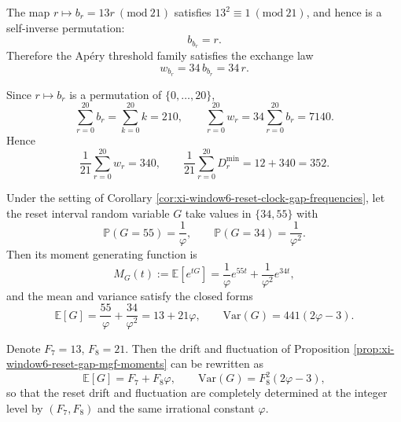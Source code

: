 

\begin{proposition}\label{prop:xi-window6-congruence-involution}
The map \(r\mapsto b_r=13r\ (\mathrm{mod}\ 21)\) satisfies \(13^2\equiv 1\ (\mathrm{mod}\ 21)\), and hence is a self-inverse permutation:
\[
b_{b_r}=r.
\]
Therefore the Ap\'ery threshold family satisfies the exchange law
\[
w_{b_r}=34\,b_{b_r}=34\,r.
\]
\end{proposition}

\begin{proposition}\label{prop:xi-window6-apery-first-moment}
Since \(r\mapsto b_r\) is a permutation of \(\{0,\dots,20\}\),
\[
\sum_{r=0}^{20}b_r=\sum_{k=0}^{20}k=210,
\qquad
\sum_{r=0}^{20}w_r=34\sum_{r=0}^{20}b_r=7140.
\]
Hence
\[
\frac{1}{21}\sum_{r=0}^{20}w_r=340,
\qquad
\frac{1}{21}\sum_{r=0}^{20}D_r^{\min}=12+340=352.
\]
\end{proposition}

\begin{proposition}\label{prop:xi-window6-reset-gap-mgf-moments}
Under the setting of Corollary \ref{cor:xi-window6-reset-clock-gap-frequencies},
let the reset interval random variable \(G\) take values in \(\{34,55\}\) with
\[
\mathbb P(G=55)=\frac{1}{\varphi},\qquad \mathbb P(G=34)=\frac{1}{\varphi^2}.
\]
Then its moment generating function is
\[
M_G(t):=\mathbb E[e^{tG}]
=\frac{1}{\varphi}e^{55t}+\frac{1}{\varphi^2}e^{34t},
\]
and the mean and variance satisfy the closed forms
\[
\mathbb E[G]=\frac{55}{\varphi}+\frac{34}{\varphi^2}=13+21\varphi,
\qquad
\mathrm{Var}(G)=441(2\varphi-3).
\]
\end{proposition}

\begin{corollary}\label{cor:xi-window6-reset-gap-fib-coupling}
Denote \(F_7=13\), \(F_8=21\).
Then the drift and fluctuation of Proposition \ref{prop:xi-window6-reset-gap-mgf-moments} can be rewritten as
\[
\mathbb E[G]=F_7+F_8\varphi,
\qquad
\mathrm{Var}(G)=F_8^2(2\varphi-3),
\]
so that the reset drift and fluctuation are completely determined at the integer level by \((F_7,F_8)\) and the same irrational constant \(\varphi\).
\end{corollary}

